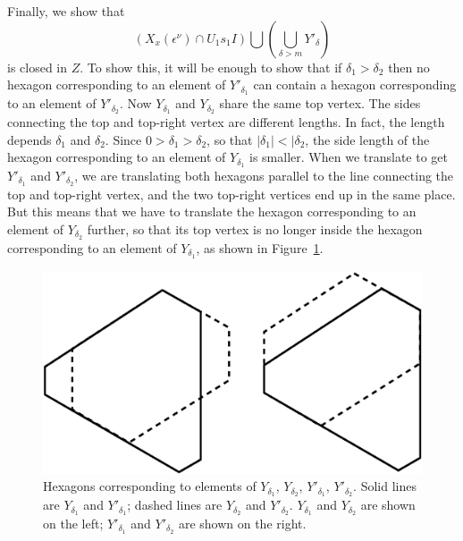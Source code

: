 \documentclass{amsart}
\theoremstyle{definition}
\def\e{\epsilon}
\def\en{\e^{\nu}}
\def\X{X_x(\en)}
\begin{document}
  Finally, we show that
  \begin{equation*}
    (\X \cap U_1 s_1 I) \bigcup \left(\bigcup_{\delta > m} Y'_\delta\right)
  \end{equation*}
  is closed in $Z$.  To show this, it will be enough to show that if $\delta_1
  > \delta_2$ then no hexagon corresponding to an element of $Y'_{\delta_1}$
  can contain a hexagon corresponding to an element of $Y'_{\delta_2}$.  Now
  $Y_{\delta_1}$ and $Y_{\delta_2}$ share the same top vertex.  The sides
  connecting the top and top-right vertex are different lengths.  In fact, the
  length depends $\delta_1$ and $\delta_2$.  Since $0 > \delta_1 > \delta_2$,
  so that $|\delta_1| < |\delta_2$, the side length of the hexagon
  corresponding to an element of $Y_{\delta_1}$ is smaller.  When we translate
  to get $Y'_{\delta_1}$ and $Y'_{\delta_2}$, we are translating both hexagons
  parallel to the line connecting the top and top-right vertex, and the two
  top-right vertices end up in the same place.  But this means that we have to
  translate the hexagon corresponding to an element of $Y_{\delta_2}$ further,
  so that its top vertex is no longer inside the hexagon corresponding to an
  element of $Y_{\delta_1}$, as shown in Figure~\ref{fig:different-lengths}.
  \begin{figure}[htbp]
    \begin{center}
      \includegraphics{different-lengths}
    \end{center}
    \caption{Hexagons corresponding to elements of $Y_{\delta_1}$,
    $Y_{\delta_2}$, $Y'_{\delta_1}$, $Y'_{\delta_2}$.  Solid lines are
    $Y_{\delta_1}$ and $Y'_{\delta_1}$; dashed lines are $Y_{\delta_2}$ and
    $Y'_{\delta_2}$. $Y_{\delta_1}$ and $Y_{\delta_2}$ are shown on the left;
    $Y'_{\delta_1}$ and  $Y'_{\delta_2}$ are shown on the right.}
    \label{fig:different-lengths}
  \end{figure}
\end{document}

